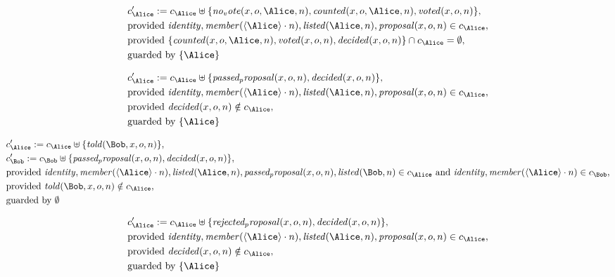 \begin{align*}
&
c'_
{
\Alice
}
 := 
c_
{
\Alice
}
 \uplus 
\{
\mathit{
no_vote
}
(
x
,
o
,
\Alice
,
n
)
,
\mathit{
counted
}
(
x
,
o
,
\Alice
,
n
)
,
\mathit{
voted
}
(
x
,
o
,
n
)
\}
,\\
&
\text{provided } 
\mathit{
identity
}
,
\mathit{
member
}
(
\langle
\Alice
\rangle
\cdot
n
)
,
\mathit{
listed
}
(
\Alice
,
n
)
,
\mathit{
proposal
}
(
x
,
o
,
n
)
 \in c_
{
\Alice
}
,\\
&
\text{provided } 
\{
\mathit{
counted
}
(
x
,
o
,
\Alice
,
n
)
,
\mathit{
voted
}
(
x
,
o
,
n
)
,
\mathit{
decided
}
(
x
,
o
,
n
)
\}
 \cap c_
{
\Alice
}
 = \emptyset
,\\
&
\text{guarded by } \{
\Alice
\}
\end{align*}

\begin{align*}
&
c'_
{
\Alice
}
 := 
c_
{
\Alice
}
 \uplus 
\{
\mathit{
passed_proposal
}
(
x
,
o
,
n
)
,
\mathit{
decided
}
(
x
,
o
,
n
)
\}
,\\
&
\text{provided } 
\mathit{
identity
}
,
\mathit{
member
}
(
\langle
\Alice
\rangle
\cdot
n
)
,
\mathit{
listed
}
(
\Alice
,
n
)
,
\mathit{
proposal
}
(
x
,
o
,
n
)
 \in c_
{
\Alice
}
,\\
&
\text{provided } 
\mathit{
decided
}
(
x
,
o
,
n
)
 \notin c_
{
\Alice
}
,\\
&
\text{guarded by } \{
\Alice
\}
\end{align*}

\begin{align*}
&
c'_
{
\Alice
}
 := 
c_
{
\Alice
}
 \uplus 
\{
\mathit{
told
}
(
\Bob
,
x
,
o
,
n
)
\}
,\\
&
c'_
{
\Bob
}
 := 
c_
{
\Bob
}
 \uplus 
\{
\mathit{
passed_proposal
}
(
x
,
o
,
n
)
,
\mathit{
decided
}
(
x
,
o
,
n
)
\}
,\\
&
\text{provided } 
\mathit{
identity
}
,
\mathit{
member
}
(
\langle
\Alice
\rangle
\cdot
n
)
,
\mathit{
listed
}
(
\Alice
,
n
)
,
\mathit{
passed_proposal
}
(
x
,
o
,
n
)
,
\mathit{
listed
}
(
\Bob
,
n
)
 \in c_
{
\Alice
}
 \text{ and } 
\mathit{
identity
}
,
\mathit{
member
}
(
\langle
\Alice
\rangle
\cdot
n
)
 \in c_
{
\Bob
}
,\\
&
\text{provided } 
\mathit{
told
}
(
\Bob
,
x
,
o
,
n
)
 \notin c_
{
\Alice
}
,\\
&
\text{guarded by } \emptyset
\end{align*}

\begin{align*}
&
c'_
{
\Alice
}
 := 
c_
{
\Alice
}
 \uplus 
\{
\mathit{
rejected_proposal
}
(
x
,
o
,
n
)
,
\mathit{
decided
}
(
x
,
o
,
n
)
\}
,\\
&
\text{provided } 
\mathit{
identity
}
,
\mathit{
member
}
(
\langle
\Alice
\rangle
\cdot
n
)
,
\mathit{
listed
}
(
\Alice
,
n
)
,
\mathit{
proposal
}
(
x
,
o
,
n
)
 \in c_
{
\Alice
}
,\\
&
\text{provided } 
\mathit{
decided
}
(
x
,
o
,
n
)
 \notin c_
{
\Alice
}
,\\
&
\text{guarded by } \{
\Alice
\}
\end{align*}
